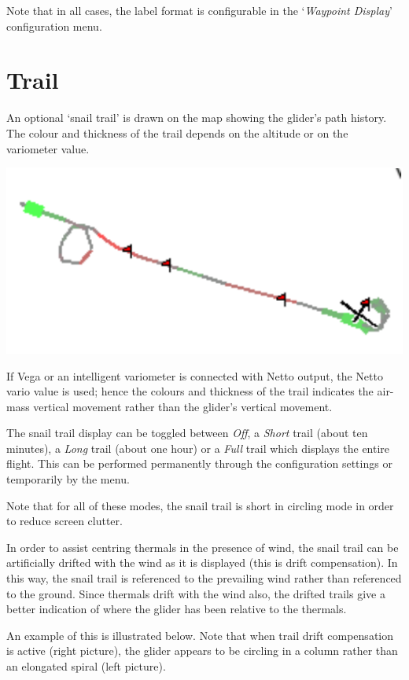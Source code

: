Note that in all cases, the label format is configurable in the 
`\emph{Waypoint Display}' configuration menu.  


\section{Trail}\label{sec:trail}

An optional `snail trail' is drawn on the map showing the glider's
path history.  The colour and thickness of the trail depends on the altitude or
on the variometer value. 

\begin{center}
\includegraphics[angle=0,width=0.5\linewidth,keepaspectratio='true']{figures/snail.pdf}
\end{center}

If Vega or an intelligent variometer is connected with Netto output,
the Netto vario value is used; hence the colours and thickness of the
trail indicates the air-mass vertical movement rather than the glider's
vertical movement.

The snail trail display can be toggled between \emph{Off}, a \emph{Short} trail
(about ten minutes), a \emph{Long} trail (about one hour) or a \emph{Full} trail
which displays the entire flight.  This can be performed permanently
through the configuration settings or temporarily by the
menu.

Note that for all of these modes, the snail trail is short in
circling mode in order to reduce screen clutter.

In order to assist centring thermals in the presence of wind, the
snail trail can be artificially drifted with the wind as it is
displayed (this is drift compensation).  In this way, the snail trail
is referenced to the prevailing wind rather than referenced to the
ground.  Since thermals drift with the wind also, the drifted trails
give a better indication of where the glider has been relative to the
thermals.

An example of this is illustrated below.  Note that when trail drift
compensation is active (right picture), the glider appears to be
circling in a column rather than an elongated spiral (left picture).


